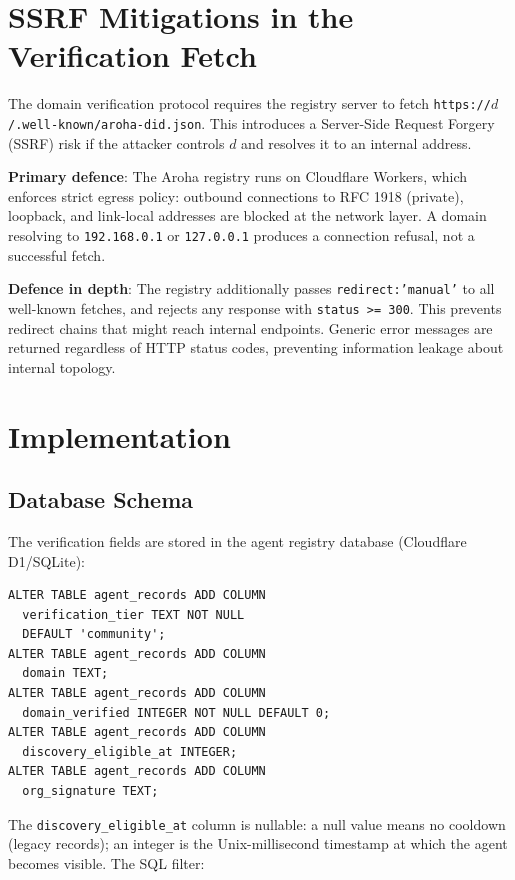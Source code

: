 \documentclass[conference]{IEEEtran}
\begin{document}
\section{SSRF Mitigations in the Verification Fetch}
\label{sec:ssrf}

The domain verification protocol requires the registry
server to fetch \texttt{https://}$d$\texttt{/.well-known/aroha-did.json}.
This introduces a Server-Side Request Forgery (SSRF) risk
if the attacker controls $d$ and resolves it to an internal
address.

\textbf{Primary defence}: The Aroha registry runs on
Cloudflare Workers, which enforces strict egress policy:
outbound connections to RFC 1918 (private), loopback, and
link-local addresses are blocked at the network layer. A
domain resolving to \texttt{192.168.0.1} or
\texttt{127.0.0.1} produces a connection refusal, not a
successful fetch.

\textbf{Defence in depth}: The registry additionally passes
\texttt{redirect:'manual'} to all well-known fetches, and
rejects any response with \texttt{status >= 300}. This
prevents redirect chains that might reach internal endpoints.
Generic error messages are returned regardless of HTTP status
codes, preventing information leakage about internal topology.

\section{Implementation}
\label{sec:impl}

\subsection{Database Schema}

The verification fields are stored in the agent registry
database (Cloudflare D1/SQLite):

\begin{verbatim}
ALTER TABLE agent_records ADD COLUMN
  verification_tier TEXT NOT NULL
  DEFAULT 'community';
ALTER TABLE agent_records ADD COLUMN
  domain TEXT;
ALTER TABLE agent_records ADD COLUMN
  domain_verified INTEGER NOT NULL DEFAULT 0;
ALTER TABLE agent_records ADD COLUMN
  discovery_eligible_at INTEGER;
ALTER TABLE agent_records ADD COLUMN
  org_signature TEXT;
\end{verbatim}

The \texttt{discovery\_eligible\_at} column is nullable:
a null value means no cooldown (legacy records); an integer
is the Unix-millisecond timestamp at which the agent
becomes visible. The SQL filter:
\end{document}
